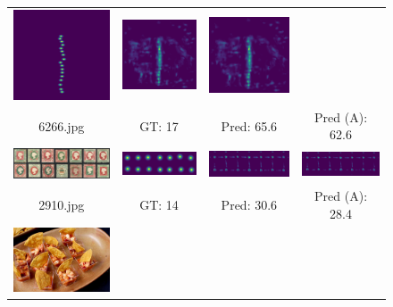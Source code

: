 \begin{figure}[htb]
\begin{tabular}{cccc}
		\includegraphics[width=0.24\linewidth]{fig/6266_gt.png} &
		\includegraphics[width=0.24\linewidth]{fig/6266_predict.png} &
		\includegraphics[width=0.24\linewidth]{fig/6266_adapt.png} \\ 
		6266.jpg & GT: 17 & Pred: 65.6 & Pred (A): 62.6 \\ 
		\includegraphics[width=0.24\linewidth]{fig/2910_img.jpg} &
		\includegraphics[width=0.24\linewidth]{fig/2910_gt.png} &
		\includegraphics[width=0.24\linewidth]{fig/2910_predict.png} &
		\includegraphics[width=0.24\linewidth]{fig/2910_adapt.png} \\
		2910.jpg & GT: 14 & Pred: 30.6 & Pred (A): 28.4 \\
		\includegraphics[width=0.24\linewidth]{fig/4112_img.jpg} &

\end{tabular}
\end{figure}
